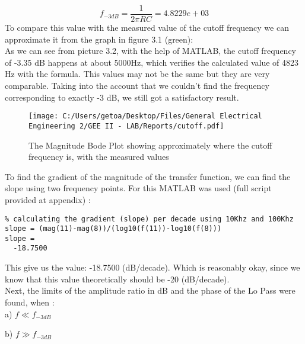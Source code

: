 \documentclass[12pt]{report}
\begin{document}
$$ f_{-3dB} = \frac{1}{2\pi R C} = 4.8229e+03 $$
To compare this value with the measured value of the cutoff frequency we can approximate it from the graph in figure 3.1 (green):\\
As we can see from picture 3.2, with the help of MATLAB, the cutoff frequency of -3.35 dB happens at about 5000Hz, which verifies the calculated value of 4823 Hz with the formula. This values may not be the same but they are very comparable. Taking into the account that we couldn't find the frequency corresponding to exactly -3 dB, we still got a satisfactory result.
\begin{figure}
\centering
\texttt{[image: C:/Users/getoa/Desktop/Files/General Electrical Engineering 2/GEE II - LAB/Reports/cutoff.pdf]}
\caption{The Magnitude Bode Plot showing approximately where the cutoff frequency is, with the measured values}
\end{figure}
\FloatBarrier
To find the gradient of the magnitude of the transfer function, we can find the slope using two frequency points. For this MATLAB was used (full script provided at appendix) :
\begin{verbatim}
% calculating the gradient (slope) per decade using 10Khz and 100Khz
slope = (mag(11)-mag(8))/(log10(f(11))-log10(f(8)))
slope =
  -18.7500
\end{verbatim}
This give us the value: -18.7500 (dB/decade). Which is reasonably okay, since we know that this value theoretically should be -20 (dB/decade).\\
Next, the limits of the amplitude ratio in dB and the phase of the Lo Pass were found, when : \\

a) $f \ll f_{-3dB}$

b) $f \gg f_{-3dB}$
\end{document}
